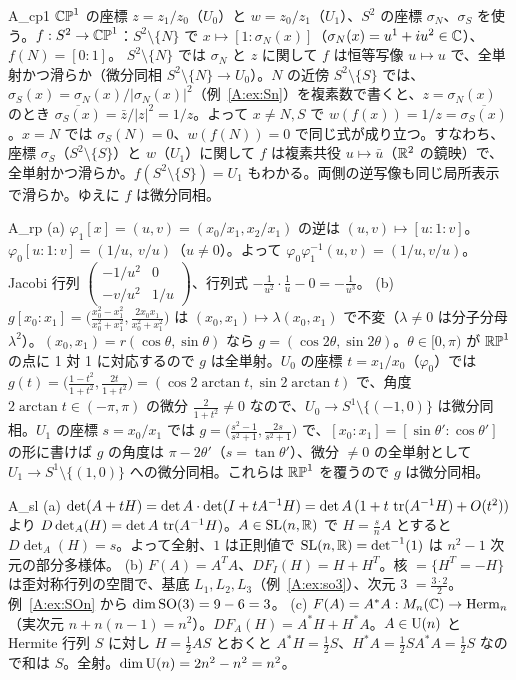 \begin{soll}{A_cp1}
$\mathbb{CP}^1$ の座標 $z=z_1/z_0$（$U_0$）と $w=z_0/z_1$（$U_1$）、$S^2$ の座標 $\sigma_N$、$\sigma_S$ を使う。$f:S^2\to\mathbb{CP}^1$：$S^2\setminus\{N\}$ で $x\mapsto[1:\sigma_N(x)]$（$\sigma_N(x)=u^1+iu^2\in\mathbb C$）、$f(N)=[0:1]$。
$S^2\setminus\{N\}$ では $\sigma_N$ と $z$ に関して $f$ は恒等写像 $u\mapsto u$ で、全単射かつ滑らか（微分同相 $S^2\setminus\{N\}\to U_0$）。$N$ の近傍 $S^2\setminus\{S\}$ では、$\sigma_S(x)=\sigma_N(x)/|\sigma_N(x)|^2$（例~\ref{A:ex:Sn}）を複素数で書くと、$z=\sigma_N(x)$ のとき $\overline{\sigma_S(x)}=\bar z/|z|^2=1/z$。よって $x\neq N,S$ で $w(f(x))=1/z=\overline{\sigma_S(x)}$。$x=N$ では $\sigma_S(N)=0$、$w(f(N))=0$ で同じ式が成り立つ。すなわち、座標 $\sigma_S$（$S^2\setminus\{S\}$）と $w$（$U_1$）に関して $f$ は複素共役 $u\mapsto\bar u$（$\mathbb R^2$ の鏡映）で、全単射かつ滑らか。$f(S^2\setminus\{S\})=U_1$ もわかる。両側の逆写像も同じ局所表示で滑らか。ゆえに $f$ は微分同相。
\end{soll}

\begin{soll}{A_rp}
(a) $\varphi_1[x]=(u,v)=(x_0/x_1,x_2/x_1)$ の逆は $(u,v)\mapsto[u:1:v]$。$\varphi_0[u:1:v]=(1/u,\ v/u)$（$u\ne0$）。よって $\varphi_0\varphi_1^{-1}(u,v)=(1/u,v/u)$。Jacobi 行列 $\begin{pmatrix}-1/u^2&0\\-v/u^2&1/u\end{pmatrix}$、行列式 $-\frac1{u^2}\cdot\frac1u-0=-\frac1{u^3}$。
(b) $g[x_0:x_1]=\bigl(\frac{x_0^2-x_1^2}{x_0^2+x_1^2},\frac{2x_0x_1}{x_0^2+x_1^2}\bigr)$ は $(x_0,x_1)\mapsto\lambda(x_0,x_1)$ で不変（$\lambda\ne0$ は分子分母 $\lambda^2$）。$(x_0,x_1)=r(\cos\theta,\sin\theta)$ なら $g=(\cos2\theta,\sin2\theta)$。$\theta\in[0,\pi)$ が $\mathbb{RP}^1$ の点に 1 対 1 に対応するので $g$ は全単射。$U_0$ の座標 $t=x_1/x_0$（$\varphi_0$）では $g(t)=\bigl(\frac{1-t^2}{1+t^2},\frac{2t}{1+t^2}\bigr)=(\cos2\arctan t,\sin2\arctan t)$ で、角度 $2\arctan t\in(-\pi,\pi)$ の微分 $\frac2{1+t^2}\ne0$ なので、$U_0\to S^1\setminus\{(-1,0)\}$ は微分同相。$U_1$ の座標 $s=x_0/x_1$ では $g=\bigl(\frac{s^2-1}{s^2+1},\frac{2s}{s^2+1}\bigr)$ で、$[x_0:x_1]=[\sin\theta':\cos\theta']$ の形に書けば $g$ の角度は $\pi-2\theta'$（$s=\tan\theta'$）、微分 $\ne0$ の全単射として $U_1\to S^1\setminus\{(1,0)\}$ への微分同相。これらは $\mathbb{RP}^1$ を覆うので $g$ は微分同相。
\end{soll}

\begin{soll}{A_sl}
(a) $\det(A+tH)=\det A\cdot\det(I+tA^{-1}H)=\det A\,(1+t\,\operatorname{tr}(A^{-1}H)+O(t^2))$ より $D\det_A(H)=\det A\,\operatorname{tr}(A^{-1}H)$。$A\in\mathrm{SL}(n,\mathbb R)$ で $H=\frac sn A$ とすると $D\det_A(H)=s$。よって全射、$1$ は正則値で $\mathrm{SL}(n,\mathbb R)=\det^{-1}(1)$ は $n^2-1$ 次元の部分多様体。
(b) $F(A)=A^TA$、$DF_I(H)=H+H^T$。核 $=\{H^T=-H\}$ は歪対称行列の空間で、基底 $L_1,L_2,L_3$（例~\ref{A:ex:so3}）、次元 $3$ $=\frac{3\cdot2}2$。例~\ref{A:ex:SOn} から $\dim\mathrm{SO}(3)=9-6=3$。
(c) $F(A)=A^*A:M_n(\mathbb C)\to\mathrm{Herm}_n$（実次元 $n+n(n-1)=n^2$）。$DF_A(H)=A^*H+H^*A$。$A\in\mathrm{U}(n)$ と Hermite 行列 $S$ に対し $H=\frac12AS$ とおくと $A^*H=\frac12S$、$H^*A=\frac12SA^*A=\frac12S$ なので和は $S$。全射。$\dim\mathrm{U}(n)=2n^2-n^2=n^2$。
\end{soll}

